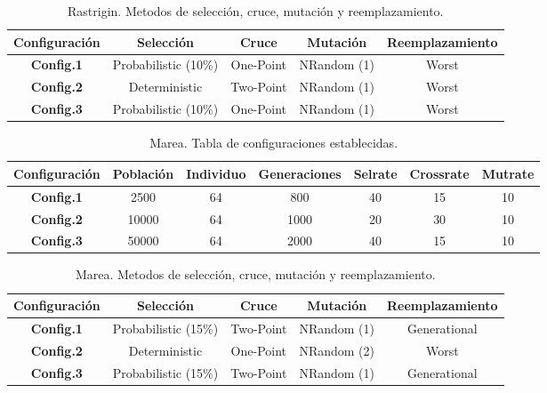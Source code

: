 \documentclass[runningheads]{llncs}
\begin{document}
\begin{table}[htb]
  \begin{tabular}{|| c | c | c | c | c ||}
    \hline
    \textbf{Configuración} & \textbf{Selección} & \textbf{Cruce} & \textbf{Mutación} & \textbf{Reemplazamiento} \\
    \hline
    \textbf{Config.1} & Probabilistic (10\%) & One-Point & NRandom (1) & Worst \\
    \hline
     \textbf{Config.2} & Deterministic & Two-Point & NRandom (1) & Worst  \\
    \hline
    \textbf{Config.3} & Probabilistic (10\%) & One-Point & NRandom (1) & Worst  \\
    \hline
  \end{tabular}
  \caption{Rastrigin. Metodos de selección, cruce, mutación y reemplazamiento.} 
  \label{TablaMetodosRastrigin}
\end{table}

\begin{table}[htb]

  \begin{tabular}{|| c | c | c | c |c | c | c ||}
    \hline
    \textbf{Configuración} & \textbf{Población} & \textbf{Individuo} & \textbf{Generaciones} &
    \textbf{Selrate} & \textbf{Crossrate} & \textbf{Mutrate}  \\

    \hline
    \textbf{Config.1} & 2500 & 64 & 800 & 40 & 15 & 10 \\
    \hline
    \textbf{Config.2} & 10000 & 64 & 1000 & 20 & 30 & 10 \\
    \hline
    \textbf{Config.3} & 50000 & 64 & 2000 & 40 & 15 & 10 \\
    \hline
  \end{tabular}
  \caption{Marea. Tabla de configuraciones establecidas.} 
  \label{TablaParametrosMarea}
\end{table}

\begin{table}[htb]
  \begin{tabular}{|| c | c | c | c | c ||}
    \hline
    \textbf{Configuración} & \textbf{Selección} & \textbf{Cruce} & \textbf{Mutación} & \textbf{Reemplazamiento} \\
    \hline
    \textbf{Config.1} & Probabilistic (15\%) & Two-Point & NRandom (1) & Generational \\
    \hline
     \textbf{Config.2} & Deterministic & One-Point & NRandom (2) & Worst  \\
    \hline
    \textbf{Config.3} & Probabilistic (15\%) & Two-Point & NRandom (1) & Generational  \\
    \hline
  \end{tabular}
  \caption{Marea. Metodos de selección, cruce, mutación y reemplazamiento.} 
  \label{TablaMetodosMarea}
\end{table}
\end{document}
